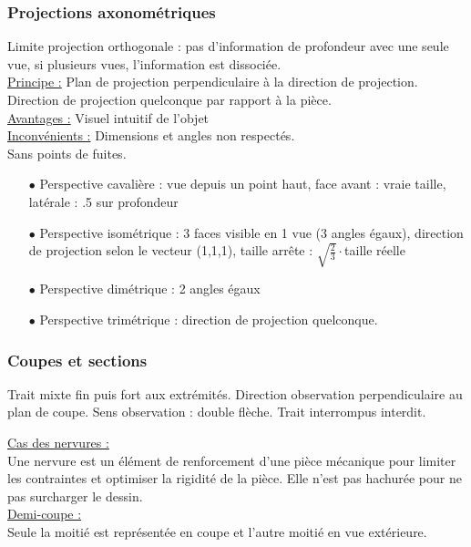 \documentclass[../main.tex]{subfiles}
\begin{document}
\subsubsection{Projections axonométriques}
Limite projection orthogonale : pas d'information de profondeur avec une seule vue, si plusieurs vues, l'information est dissociée.\\
\underline{Principe :} Plan de projection perpendiculaire à la direction de projection. Direction de projection quelconque par rapport à la pièce. \\
\underline{Avantages :} Visuel intuitif de l'objet\\
\underline{Inconvénients :} Dimensions et angles non respectés.\\
Sans points de fuites. 
\begin{itemize}
    \item[$\bullet$] Perspective cavalière : vue depuis un point haut, face avant : vraie taille, latérale : .5 sur profondeur\\
    \item[$\bullet$] Perspective isométrique : 3 faces visible en 1 vue (3 angles égaux), direction de projection selon le vecteur (1,1,1), taille arrête : $\sqrt{\frac{2}{3}}\cdot$taille réelle\\
    \item[$\bullet$]Perspective dimétrique : 2 angles égaux\\
    \item[$\bullet$]Perspective trimétrique : direction de projection quelconque.\\
\end{itemize}

\subsubsection{Coupes et sections}
Trait mixte fin puis fort aux extrémités. Direction observation perpendiculaire au plan de coupe. Sens observation : double flèche. Trait interrompus interdit. 

\quad \underline{Cas des nervures :}\\
Une nervure est un élément de renforcement d'une pièce mécanique pour limiter les contraintes et optimiser la rigidité de la pièce. Elle n'est pas hachurée pour ne pas surcharger le dessin.\\

\quad \underline{Demi-coupe :}\\
Seule la moitié est représentée en coupe et l'autre moitié en vue extérieure.\\
\end{document}

